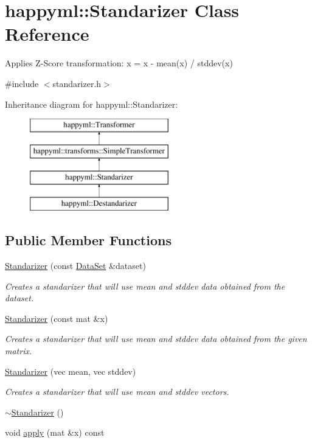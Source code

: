 \hypertarget{classhappyml_1_1Standarizer}{}\section{happyml\+:\+:Standarizer Class Reference}
\label{classhappyml_1_1Standarizer}


Applies Z-\/\+Score transformation\+: x\textquotesingle{} = x -\/ mean(x) / stddev(x)  




{\ttfamily \#include $<$standarizer.\+h$>$}

Inheritance diagram for happyml\+:\+:Standarizer\+:\begin{figure}[H]
\begin{center}
\leavevmode
\includegraphics[height=4.000000cm]{classhappyml_1_1Standarizer}
\end{center}
\end{figure}
\subsection*{Public Member Functions}
\begin{DoxyCompactItemize}
\item 
\hyperlink{classhappyml_1_1Standarizer_a017f97c038070ab78c0c7d0e4fd3dc96}{Standarizer} (const \hyperlink{classhappyml_1_1DataSet}{Data\+Set} \&dataset)
\begin{DoxyCompactList}\small\item\em Creates a standarizer that will use mean and stddev data obtained from the dataset. \end{DoxyCompactList}\item 
\hyperlink{classhappyml_1_1Standarizer_ac0c6d451821afef5832cae79e28edf35}{Standarizer} (const mat \&x)
\begin{DoxyCompactList}\small\item\em Creates a standarizer that will use mean and stddev data obtained from the given matrix. \end{DoxyCompactList}\item 
\hyperlink{classhappyml_1_1Standarizer_a5b69e125c31e779feaf00d30109dd576}{Standarizer} (vec mean, vec stddev)
\begin{DoxyCompactList}\small\item\em Creates a standarizer that will use mean and stddev vectors. \end{DoxyCompactList}\item 
\hyperlink{classhappyml_1_1Standarizer_aa603e5cce8b82997914cf9d1fe67cd88}{$\sim$\+Standarizer} ()
\item 
void \hyperlink{classhappyml_1_1Standarizer_a5c9b416b657cb61972c27b27fd379b2d}{apply} (mat \&x) const 
\end{DoxyCompactItemize}

